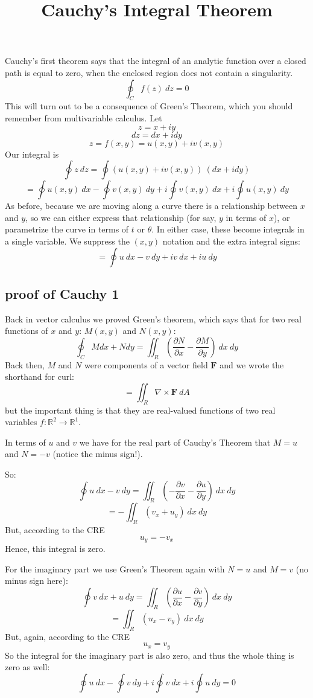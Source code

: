 \documentclass[11pt, oneside]{article}
\title{Cauchy's Integral Theorem}
\date{}
\begin{document}
\maketitle
\Large

Cauchy's first theorem says that the integral of an analytic function over a closed path is equal to zero, when the enclosed region does not contain a singularity.
\[ \oint_C f(z) \ dz = 0 \]
This will turn out to be a consequence of Green's Theorem, which you should remember from multivariable calculus.  Let
\[ z = x + i y \]
\[ dz = dx + i dy \]
\[ z = f(x,y) = u(x,y) + iv(x,y) \]
Our integral is
\[ \oint z \ dz = \oint (u(x,y) + iv(x,y)) \ (dx + i dy) \]
\[ =  \oint u(x,y) \ dx - \oint v(x,y) \ dy + i \oint v(x,y) \ dx + i \oint u(x,y) \ dy \]
As before, because we are moving along a curve there is a relationship between $x$ and $y$, so we can either express that relationship (for say, $y$ in terms of $x$), or parametrize the curve in terms of $t$ or $\theta$.  In either case, these become integrals in a single variable.  We suppress the $(x,y)$ notation and the extra integral signs:
\[ =  \oint u \ dx - v \ dy + i v \ dx + i u \ dy \]

\subsection*{proof of Cauchy 1}
Back in vector calculus we proved Green's theorem, which says that for two real functions of $x$ and $y$:  $M(x,y)$ and $N(x,y)$:
\[ \oint_C M dx + N dy = \iint_R (\frac{\partial N}{\partial x} - \frac{\partial M}{\partial y}) \ dx \ dy \]
Back then, $M$ and $N$ were components of a vector field $\mathbf{F}$ and we wrote the shorthand for curl:
\[ = \iint_R \nabla \times \mathbf{F} \ dA\]
but the important thing is that they are real-valued functions of two real variables $f: \mathbb{R}^2 \rightarrow \mathbb{R}^1$.

In terms of $u$ and $v$ we have for the real part of Cauchy's Theorem that $M=u$ and $N = -v$ (notice the minus sign!).  

So:
\[ \oint u \ dx - v \ dy = \iint_R (-\frac{\partial v}{\partial x} -  \frac{\partial u}{\partial y}) \ dx \ dy \]
\[ = - \iint_R (v_x + u_y) \ dx \ dy \]
But, according to the CRE
\[ u_y = -v_x \]
Hence, this integral is zero.

For the imaginary part we use Green's Theorem again with $N=u$ and $M = v$ (no minus sign here):
\[ \oint v \ dx + u \ dy =  \iint_R (\frac{\partial u}{\partial x} - \frac{\partial v}{\partial y}) \ dx \ dy \]
\[ =  \iint_R (u_x - v_y) \ dx \ dy \]
But, again, according to the CRE
\[ u_x = v_y \]
So the integral for the imaginary part is also zero, and thus the whole thing is zero as well:
\[ \oint u \ dx - \oint v \ dy + i \oint v \ dx + i \oint u \ dy = 0 \]
\end{document}
